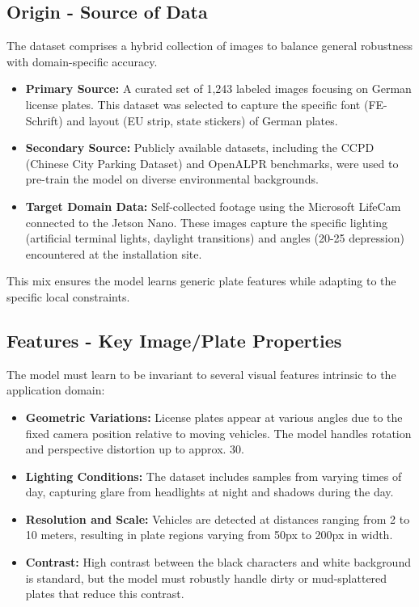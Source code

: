 \subsection{Origin - Source of Data}
The dataset comprises a hybrid collection of images to balance general robustness with domain-specific accuracy.
\begin{itemize}
	\item \textbf{Primary Source:} A curated set of 1,243 labeled images focusing on German license plates. This dataset was selected to capture the specific font (FE-Schrift) and layout (EU strip, state stickers) of German plates.
	\item \textbf{Secondary Source:} Publicly available datasets, including the CCPD (Chinese City Parking Dataset) and OpenALPR benchmarks, were used to pre-train the model on diverse environmental backgrounds.
	\item \textbf{Target Domain Data:} Self-collected footage using the Microsoft LifeCam connected to the Jetson Nano. These images capture the specific lighting (artificial terminal lights, daylight transitions) and angles (20-25\textdegree{} depression) encountered at the installation site.
\end{itemize}
This mix ensures the model learns generic plate features while adapting to the specific local constraints.

\subsection{Features - Key Image/Plate Properties}
The model must learn to be invariant to several visual features intrinsic to the application domain:
\begin{itemize}
	\item \textbf{Geometric Variations:} License plates appear at various angles due to the fixed camera position relative to moving vehicles. The model handles rotation and perspective distortion up to approx. 30\textdegree.
	\item \textbf{Lighting Conditions:} The dataset includes samples from varying times of day, capturing glare from headlights at night and shadows during the day.
	\item \textbf{Resolution and Scale:} Vehicles are detected at distances ranging from 2 to 10 meters, resulting in plate regions varying from 50px to 200px in width.
	\item \textbf{Contrast:} High contrast between the black characters and white background is standard, but the model must robustly handle dirty or mud-splattered plates that reduce this contrast.
\end{itemize}

